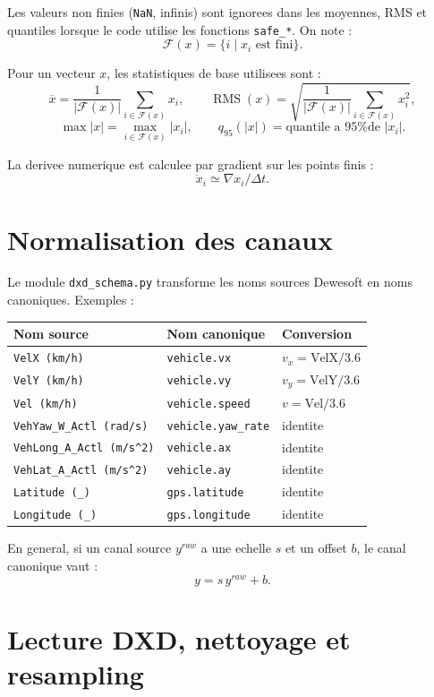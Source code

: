 \documentclass[11pt,a4paper]{article}
\newcommand{\RMS}{\operatorname{RMS}}
\newcommand{\finite}{\mathcal{F}}
\begin{document}
Les valeurs non finies (\texttt{NaN}, infinis) sont ignorees dans les moyennes, RMS et quantiles lorsque le code utilise les fonctions \texttt{safe\_*}. On note :
\[
  \finite(x)=\{i \mid x_i \text{ est fini}\}.
\]

Pour un vecteur $x$, les statistiques de base utilisees sont :
\[
  \overline{x}=\frac{1}{|\finite(x)|}\sum_{i\in\finite(x)}x_i,
  \qquad
  \RMS(x)=\sqrt{\frac{1}{|\finite(x)|}\sum_{i\in\finite(x)}x_i^2},
\]
\[
  \max |x| = \max_{i\in\finite(x)} |x_i|,
  \qquad
  q_{95}(|x|)=\text{quantile a 95\% de } |x_i|.
\]

La derivee numerique est calculee par gradient sur les points finis :
\[
  \dot{x}_i \simeq \nabla x_i / \Delta t.
\]

\section{Normalisation des canaux}

Le module \texttt{dxd\_schema.py} transforme les noms sources Dewesoft en noms canoniques. Exemples :

\begin{longtable}{lll}
\toprule
Nom source & Nom canonique & Conversion \\
\midrule
\texttt{VelX (km/h)} & \texttt{vehicle.vx} & $v_x = \text{VelX}/3.6$ \\
\texttt{VelY (km/h)} & \texttt{vehicle.vy} & $v_y = \text{VelY}/3.6$ \\
\texttt{Vel (km/h)} & \texttt{vehicle.speed} & $v = \text{Vel}/3.6$ \\
\texttt{VehYaw\_W\_Actl (rad/s)} & \texttt{vehicle.yaw\_rate} & identite \\
\texttt{VehLong\_A\_Actl (m/s\^{}2)} & \texttt{vehicle.ax} & identite \\
\texttt{VehLat\_A\_Actl (m/s\^{}2)} & \texttt{vehicle.ay} & identite \\
\texttt{Latitude (\_)} & \texttt{gps.latitude} & identite \\
\texttt{Longitude (\_)} & \texttt{gps.longitude} & identite \\
\bottomrule
\end{longtable}

En general, si un canal source $y^{raw}$ a une echelle $s$ et un offset $b$, le canal canonique vaut :
\[
  y = s\,y^{raw}+b.
\]

\section{Lecture DXD, nettoyage et resampling}
\end{document}
